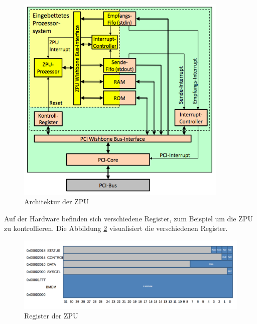 \documentclass[11pt]{scrartcl}
\begin{document}
\begin{figure}[H]
	\begin{center}
		\includegraphics[width=0.9\textwidth]{images/zpu_architecture}
		\caption{Architektur der ZPU}
		\label{zpu_architecture}	
	\end{center}
\end{figure}

Auf der Hardware befinden sich verschiedene Register, zum Beispiel um die ZPU zu kontrollieren. Die Abbildung \ref{zpu_registers} visualisiert die verschiedenen Register.

\begin{figure}[H]
	\begin{center}
		\includegraphics[width=1\textwidth]{images/registers}
		\caption{Register der ZPU}
		\label{zpu_registers}	
	\end{center}
\end{figure}
\end{document}
